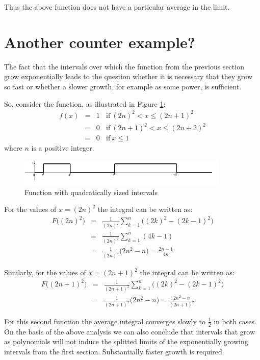 \documentclass[onecolumn]{article}
\begin{document}
Thus the above function does not have a particular average in the limit.

\section*{Another counter example?}
The fact that the intervals over which the function from the previous section grow exponentially leads to the question
whether it is necessary that they grow so fast or whether a slower growth, for example as some power, is sufficient.

So, consider the function, as illustrated in Figure \ref{quadfunc}:
\begin{eqnarray}
             f(x) &=& 1 ~~~~\textrm{if} ~(2n)^2 < x \leq (2n+1)^2   \\
\nonumber         &=& 0 ~~~~\textrm{if} ~(2n+1)^2 < x \leq (2n+2)^2 \\
\nonumber         &=& 0 ~~~~\textrm{if} ~x \leq 1
\end{eqnarray}
\noindent where $n$ is a positive integer.

\begin{figure}[H]
\caption{Function with quadratically sized intervals}
\label{quadfunc}
\begin{center}
\includegraphics[width=0.9\textwidth]{bounded_2.pdf}
\end{center}
\end{figure}

For the values of $x = (2n)^2$ the integral can be written as:
\begin{eqnarray}
    F\bigl( (2n)^2 \bigr) &=& \frac{1}{(2n)^2} \sum_{k=1}^n \bigl( (2k)^2 - (2k-1)^2 \bigr) \\
\nonumber                 &=& \frac{1}{(2n)^2} \sum_{k=1}^n (4k - 1) \\
\nonumber                 &=& \frac{1}{(2n)^2} \bigl( 2n^2 - n \bigr) = \frac{2n - 1}{4n}
\end{eqnarray}

Similarly, for the values of $x = (2n+1)^2$ the integral can be written as:
\begin{eqnarray}
    F\bigl( (2n+1)^2 \bigr) &=& \frac{1}{(2n+1)^2} \sum_{k=1}^n \bigl( (2k)^2 - (2k-1)^2 \bigr) \\
\nonumber                   &=& \frac{1}{(2n+1)^2} \bigl( 2n^2 - n \bigr) = \frac{2n^2 - n}{(2n+1)^2}
\end{eqnarray}

For this second function the average integral converges slowly to $\frac{1}{2}$ in both cases.
On the basis of the above analysis we can also conclude that intervals that grow as polynomials
will not induce the splitted limits of the exponentially growing intervals from the first section.
Substantially faster growth is required.
\end{document}
